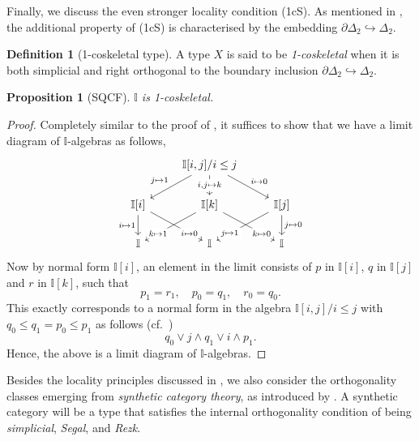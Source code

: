 \documentclass[a4paper,12pt]{amsart}
\newtheorem{proposition}[theorem]{Proposition}
\theoremstyle{definition}
\newtheorem{definition}[theorem]{Definition}
\newcommand{\mbb}[1]{\mathbb{#1}}
\newcommand{\I}{\mbb I}
\newcommand{\hook}{\hookrightarrow}
\begin{document}
Finally, we discuss the even stronger locality condition (1cS). As mentioned in , the additional property of (1cS) is characterised by the embedding $\partial\Delta_2 \hook \Delta_2$.

\begin{definition}[1-coskeletal type]
  A type $X$ is said to be \emph{1-coskeletal} when it is both simplicial and right orthogonal to the boundary inclusion $\partial\Delta_2 \hook \Delta_2$.
\end{definition}

\begin{proposition}[SQCF]\label{specis1t}
  $\I$ is 1-coskeletal.
\end{proposition}
\begin{proof}
  Completely similar to the proof of , it suffices to show that we have a limit diagram of $\I$-algebras as follows,
  \[\begin{tikzcd}
    & {\I[i,j]/i\le j} \\
    \I[i] & \I[k] & \I[j] \\
    \I & \I & \I
    \arrow["{j \mapsto 1}"', from=1-2, to=2-1]
    \arrow["{i,j \mapsto k}"{description}, from=1-2, to=2-2]
    \arrow["{i \mapsto 0}", from=1-2, to=2-3]
    \arrow["i \mapsto 1"', from=2-1, to=3-1]
    \arrow["i \mapsto 0"{description, pos=0.75}, from=2-1, to=3-2]
    \arrow["k \mapsto 1"{description, pos=0.75}, from=2-2, to=3-1]
    \arrow["k \mapsto 0"{description, pos=0.75}, from=2-2, to=3-3]
    \arrow["j \mapsto 1"{description, pos=0.75}, from=2-3, to=3-2]
    \arrow["j \mapsto 0", from=2-3, to=3-3]
  \end{tikzcd}\]
  Now by normal form $\I[i]$, an element in the limit consists of $p$ in $\I[i]$, $q$ in $\I[j]$ and $r$ in $\I[k]$, such that
  \[ p_1 = r_1, \quad p_0 = q_1, \quad r_0 = q_0. \]
  This exactly corresponds to a normal form in the algebra $\I[i,j]/i\le j$ with $q_0 \le q_1 = p_0 \le p_1$ as follows (cf.\ )
  \[ q_0 \vee j \wedge q_1 \vee i \wedge p_1. \]
  Hence, the above is a limit diagram of $\I$-algebras.
\end{proof}

Besides the locality principles discussed in , we also consider the orthogonality classes emerging from \emph{synthetic category theory}, as introduced by \citet{riehl2017type}. 
A synthetic category will be a type that satisfies the internal orthogonality condition of being \emph{simplicial}, \emph{Segal}, and \emph{Rezk}.
\end{document}
